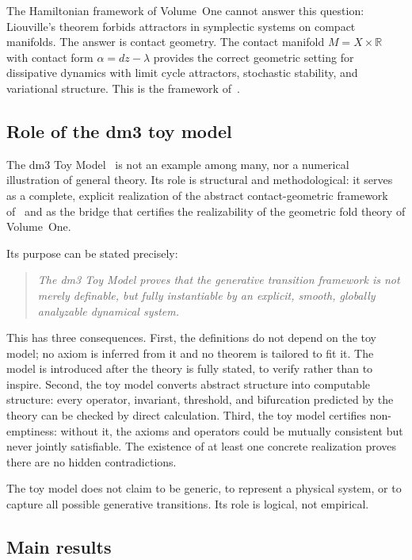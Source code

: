 \documentclass[12pt]{article}
\numberwithin{equation}{section}
\theoremstyle{remark}
\newcommand{\R}{\mathbb{R}}
\begin{document}
The Hamiltonian framework of Volume~One cannot answer this question:
Liouville's theorem forbids attractors in symplectic systems on
compact manifolds. The answer is contact geometry. The contact
manifold $M = X\times\R$ with contact form $\alpha = dz - \lambda$
provides the correct geometric setting for dissipative dynamics
with limit cycle attractors, stochastic stability, and variational
structure. This is the framework of~\cite{Paper1}.

\subsection{Role of the dm3 toy model}
\label{subsec:toymodel-role}

The dm3 Toy Model~\cite{Paper2} is not an example among many,
nor a numerical illustration of general theory. Its role is
structural and methodological: it serves as a complete, explicit
realization of the abstract contact-geometric framework of~\cite{Paper1}
and as the bridge that certifies the realizability of the geometric
fold theory of Volume~One.

Its purpose can be stated precisely:

\begin{quote}
\emph{The dm3 Toy Model proves that the generative transition
framework is not merely definable, but fully instantiable by an
explicit, smooth, globally analyzable dynamical system.}
\end{quote}

This has three consequences. First, the definitions do not depend
on the toy model; no axiom is inferred from it and no theorem is
tailored to fit it. The model is introduced after the theory is
fully stated, to verify rather than to inspire. Second, the toy
model converts abstract structure into computable structure: every
operator, invariant, threshold, and bifurcation predicted by the
theory can be checked by direct calculation. Third, the toy model
certifies non-emptiness: without it, the axioms and operators could
be mutually consistent but never jointly satisfiable. The existence
of at least one concrete realization proves there are no hidden
contradictions.

The toy model does not claim to be generic, to represent a physical
system, or to capture all possible generative transitions. Its role
is logical, not empirical.

\subsection{Main results}
\end{document}
